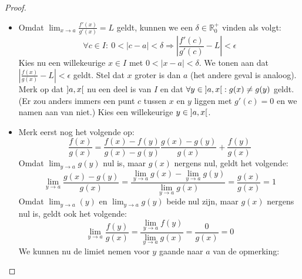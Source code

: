 \documentclass[main.tex]{subfiles}
\begin{document}
\begin{st}
\begin{proof}
\begin{itemize}
      \begin{itemize}
      \item 
        Omdat $\lim_{x \rightarrow a}\frac{f'(x)}{g'(x)} = L$ geldt, kunnen we een $\delta \in \mathbb{R}_{0}^{+}$ vinden als volgt:
        \[ \forall c\in I:\ 0<|c-a|<\delta \Rightarrow \left|\frac{f'(c)}{g'(c)}-L\right| < \epsilon \]
        Kies nu een willekeurige $x\in I$ met $0<|x-a|< \delta$.
        We tonen aan dat $|\frac{f(x)}{g(x)}-L|<\epsilon$ geldt.
        Stel dat $x$ groter is dan $a$ (het andere geval is analoog).
        Merk op dat $\interval[open]{a}{x}$ nu een deel is van $I$ en dat $\forall y \in \interval[open]{a}{x}: g(x)\neq g(y)$ geldt.
        (Er zou anders immers een punt $c$ tussen $x$ en $y$ liggen met $g'(c) =0$ en we namen aan van niet.)
        Kies een willekeurige $y \in \interval[open]{a}{x}$.
        \begin{figure}[H]
          \centering
        \end{figure}
      \item 
        Merk eerst nog het volgende op:
        \[ \frac{f(x)}{g(x)} = \frac{f(x)-f(y)}{g(x)-g(y)}\frac{g(x)-g(y)}{g(x)} + \frac{f(y)}{g(x)} \]
        Omdat $\lim_{y \rightarrow a}g(y)$ nul is, maar $g(x)$ nergens nul, geldt het volgende:
        \[ \lim_{y \rightarrow a}\frac{g(x)-g(y)}{g(x)} = \frac{\lim_{y \rightarrow a}g(x)-\lim_{y \rightarrow a}g(y)}{\lim_{y \rightarrow a}g(x)} = \frac{g(x)}{g(x)} = 1 \]
        Omdat $\lim_{y\rightarrow a}(y)$ en $\lim_{y \rightarrow a}g(y)$ beide nul zijn, maar $g(x)$ nergens nul is, geldt ook het volgende:
        \[ \lim_{y \rightarrow a}\frac{f(y)}{g(x)} = \frac{\lim_{y \rightarrow a}f(y)}{\lim_{y \rightarrow a}g(x)} = \frac{0}{g(x)} = 0 \]
        We kunnen nu de limiet nemen voor $y$ gaande naar $a$ van de opmerking:
        \[
\]
\end{itemize}
\end{itemize}
\end{proof}
\end{st}
\end{document}
